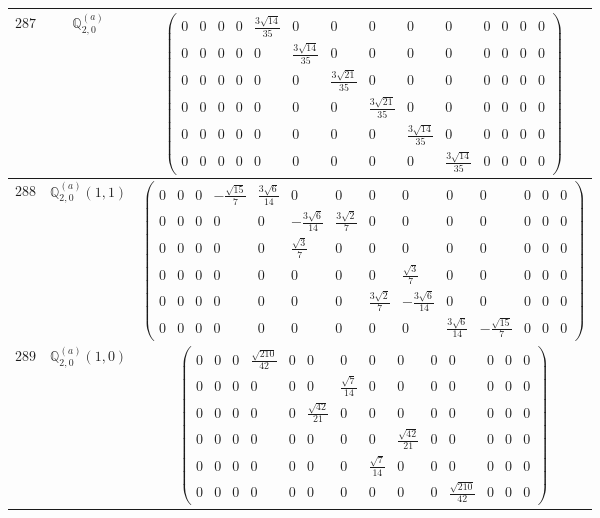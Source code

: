 \documentclass[fleqn,8pt,landscape]{jsarticle}
\begin{document}
\begin{center}
\begin{longtable}{ccc}
$ 287 $ & $ \mathbb{Q}_{2,0}^{(a)} $ & $ \begin{pmatrix} 0 & 0 & 0 & 0 & \frac{3 \sqrt{14}}{35} & 0 & 0 & 0 & 0 & 0 & 0 & 0 & 0 & 0 \\ 0 & 0 & 0 & 0 & 0 & \frac{3 \sqrt{14}}{35} & 0 & 0 & 0 & 0 & 0 & 0 & 0 & 0 \\ 0 & 0 & 0 & 0 & 0 & 0 & \frac{3 \sqrt{21}}{35} & 0 & 0 & 0 & 0 & 0 & 0 & 0 \\ 0 & 0 & 0 & 0 & 0 & 0 & 0 & \frac{3 \sqrt{21}}{35} & 0 & 0 & 0 & 0 & 0 & 0 \\ 0 & 0 & 0 & 0 & 0 & 0 & 0 & 0 & \frac{3 \sqrt{14}}{35} & 0 & 0 & 0 & 0 & 0 \\ 0 & 0 & 0 & 0 & 0 & 0 & 0 & 0 & 0 & \frac{3 \sqrt{14}}{35} & 0 & 0 & 0 & 0 \end{pmatrix} $ \\ \hline
$ 288 $ & $ \mathbb{Q}_{2,0}^{(a)}(1,1) $ & $ \begin{pmatrix} 0 & 0 & 0 & - \frac{\sqrt{15}}{7} & \frac{3 \sqrt{6}}{14} & 0 & 0 & 0 & 0 & 0 & 0 & 0 & 0 & 0 \\ 0 & 0 & 0 & 0 & 0 & - \frac{3 \sqrt{6}}{14} & \frac{3 \sqrt{2}}{7} & 0 & 0 & 0 & 0 & 0 & 0 & 0 \\ 0 & 0 & 0 & 0 & 0 & \frac{\sqrt{3}}{7} & 0 & 0 & 0 & 0 & 0 & 0 & 0 & 0 \\ 0 & 0 & 0 & 0 & 0 & 0 & 0 & 0 & \frac{\sqrt{3}}{7} & 0 & 0 & 0 & 0 & 0 \\ 0 & 0 & 0 & 0 & 0 & 0 & 0 & \frac{3 \sqrt{2}}{7} & - \frac{3 \sqrt{6}}{14} & 0 & 0 & 0 & 0 & 0 \\ 0 & 0 & 0 & 0 & 0 & 0 & 0 & 0 & 0 & \frac{3 \sqrt{6}}{14} & - \frac{\sqrt{15}}{7} & 0 & 0 & 0 \end{pmatrix} $ \\ \hline
$ 289 $ & $ \mathbb{Q}_{2,0}^{(a)}(1,0) $ & $ \begin{pmatrix} 0 & 0 & 0 & \frac{\sqrt{210}}{42} & 0 & 0 & 0 & 0 & 0 & 0 & 0 & 0 & 0 & 0 \\ 0 & 0 & 0 & 0 & 0 & 0 & \frac{\sqrt{7}}{14} & 0 & 0 & 0 & 0 & 0 & 0 & 0 \\ 0 & 0 & 0 & 0 & 0 & \frac{\sqrt{42}}{21} & 0 & 0 & 0 & 0 & 0 & 0 & 0 & 0 \\ 0 & 0 & 0 & 0 & 0 & 0 & 0 & 0 & \frac{\sqrt{42}}{21} & 0 & 0 & 0 & 0 & 0 \\ 0 & 0 & 0 & 0 & 0 & 0 & 0 & \frac{\sqrt{7}}{14} & 0 & 0 & 0 & 0 & 0 & 0 \\ 0 & 0 & 0 & 0 & 0 & 0 & 0 & 0 & 0 & 0 & \frac{\sqrt{210}}{42} & 0 & 0 & 0 \end{pmatrix} $ \\ \hline

\end{longtable}
\end{center}
\end{document}
